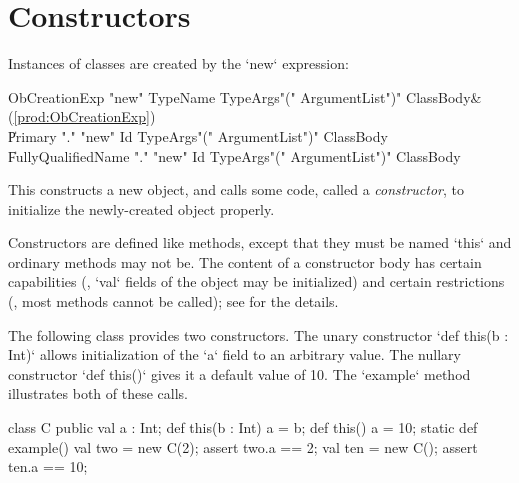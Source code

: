 \section{Constructors}
\label{sect:constructors}

Instances of classes are created by the \xcd`new` expression: \\
\begin{bbgrammar}
       ObCreationExp \: \xcd"new" TypeName TypeArgs\opt \xcd"(" ArgumentList\opt \xcd")" ClassBody\opt & (\ref{prod:ObCreationExp}) \\
                     \| Primary \xcd"." \xcd"new" Id TypeArgs\opt \xcd"(" ArgumentList\opt \xcd")" ClassBody\opt \\
                     \| FullyQualifiedName \xcd"." \xcd"new" Id TypeArgs\opt \xcd"(" ArgumentList\opt \xcd")" ClassBody\opt \\
\end{bbgrammar}

This constructs a new object, and calls some code, called a {\em constructor},
to initialize the newly-created object properly.

Constructors are defined like methods, except that they must be named \xcd`this`
and ordinary methods may not be.    The content of a constructor body has
certain capabilities (\eg, \xcd`val` fields of the object may be initialized)
and certain restrictions (\eg, most methods cannot be called); see
 for the details.

\begin{ex}

The following class provides two constructors.  The unary constructor 
\xcd`def this(b : Int)` allows initialization of the \xcd`a` field to an 
arbitrary value.  The nullary constructor \xcd`def this()` gives it a default
value of 10.  The \xcd`example` method illustrates both of these calls.


\begin{xten}
class C {
  public val a : Int;
  def this(b : Int) { a = b; } 
  def this()        { a = 10; }
  static def example() {
     val two = new C(2);
     assert two.a == 2;
     val ten = new C(); 
     assert ten.a == 10;
  }
}
\end{xten}
\end{ex}


